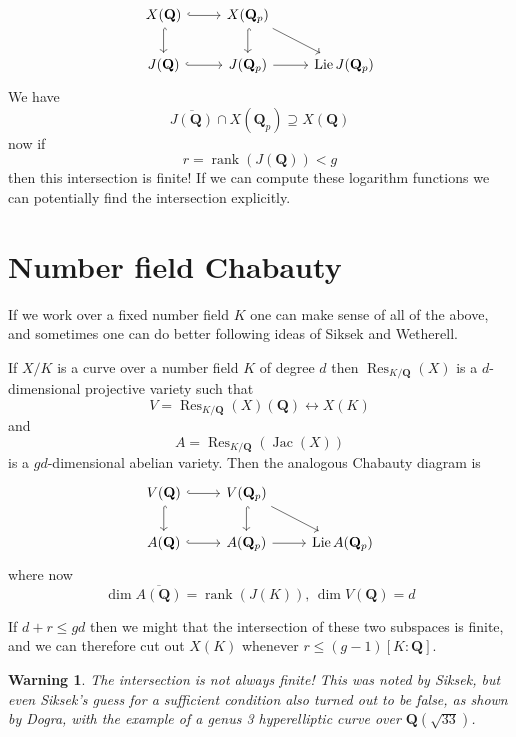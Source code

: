 \documentclass[oneside,11pt,]{article}
\newtheorem{warning}[theorem]{Warning}
\DeclareMathOperator{\Jac}{Jac}
\DeclareMathOperator{\rank}{rank}
\DeclareMathOperator{\Res}{Res}
\newcommand{\QQ}{\mathbf{Q}}
\let\emph\relax %
\begin{document}
\[\begin{tikzcd}
	{X(\mathbf Q)} & {X(\mathbf Q_p)} \\
    {J(\mathbf Q)} & {J(\mathbf Q_p)} & {\operatorname{Lie} J (\mathbf Q_p)}
	\arrow[hook, from=1-1, to=1-2]
	\arrow[hook, from=1-1, to=2-1]
	\arrow[hook, from=1-2, to=2-2]
	\arrow[hook, from=2-1, to=2-2]
	\arrow[from=1-2, to=2-3]
	\arrow[from=2-2, to=2-3]
\end{tikzcd}\]
We have
\[\overline {J(\mathbf Q)} \cap X(\mathbf Q_p) \supseteq X(\mathbf Q)\]
now if \[r = \operatorname{rank}(J(\mathbf Q)) < g\] then this intersection is finite!
If we can compute these logarithm functions we can potentially find the intersection explicitly.

\section{Number field Chabauty}
If we work over a fixed number field $K$ one can make sense of all of the above, and sometimes one can do better following ideas of Siksek and Wetherell.

If $X/K$ is a curve over a number field $K$ of degree $d$ then \(\Res_{K/\QQ} (X)\)
is a $d$-dimensional projective variety such that
\[V = \Res_{K/\QQ} (X)(\QQ) \leftrightarrow X(K)\]
and
\[A = \Res_{K/\QQ} (\Jac(X))\]
is a $gd$-dimensional abelian variety.
Then the analogous Chabauty diagram is
\[\begin{tikzcd}
	{V(\mathbf Q)} & {V(\mathbf Q_p)} \\
    {A(\mathbf Q)} & {A(\mathbf Q_p)} & {\operatorname{Lie} A (\mathbf Q_p)}
	\arrow[hook, from=1-1, to=1-2]
	\arrow[hook, from=1-1, to=2-1]
	\arrow[hook, from=1-2, to=2-2]
	\arrow[hook, from=2-1, to=2-2]
	\arrow[from=1-2, to=2-3]
	\arrow[from=2-2, to=2-3]
\end{tikzcd}\]
where now
\[\dim \overline{A(\QQ)} = \rank(J(K)),\,
\dim V(\QQ) = d\]

If \(d + r \le gd \) then we might \emph{hope} that the intersection of these two subspaces is finite, and we can therefore cut out $X(K)$ whenever
\(r \le (g - 1)[K : \QQ]\).

%
\begin{warning}
    The intersection is not always finite! This was noted by Siksek, but even Siksek's guess for a sufficient condition also turned out to be false, as shown by Dogra, with the example of a genus 3 hyperelliptic curve over $\QQ(\sqrt{33})$.
\end{warning}
\end{document}
